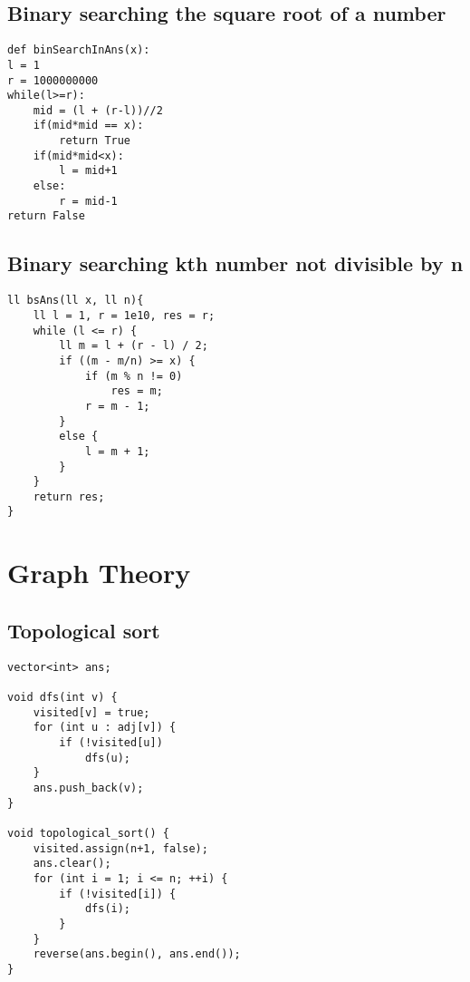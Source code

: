 \documentclass{article}
\begin{document}
\subsection{Binary searching the square root of a number}
\begin{lstlisting}
def binSearchInAns(x):
l = 1
r = 1000000000
while(l>=r):
    mid = (l + (r-l))//2
    if(mid*mid == x):
        return True
    if(mid*mid<x):
        l = mid+1
    else:
        r = mid-1
return False
\end{lstlisting}



\subsection{Binary searching kth number not divisible by n}
\begin{lstlisting}
ll bsAns(ll x, ll n){
    ll l = 1, r = 1e10, res = r;
    while (l <= r) {
        ll m = l + (r - l) / 2;
        if ((m - m/n) >= x) {
            if (m % n != 0)
                res = m;
            r = m - 1;  
        }
        else {
            l = m + 1;
        }
    }
    return res;
}
\end{lstlisting}

\section{Graph Theory}
\subsection{Topological sort}
\begin{lstlisting}
vector<int> ans;
 
void dfs(int v) {
    visited[v] = true;
    for (int u : adj[v]) {
        if (!visited[u])
            dfs(u);
    }
    ans.push_back(v);
}
 
void topological_sort() {
    visited.assign(n+1, false);
    ans.clear();
    for (int i = 1; i <= n; ++i) {
        if (!visited[i]) {
            dfs(i);
        }
    }
    reverse(ans.begin(), ans.end());
}
\end{lstlisting}
\end{document}

